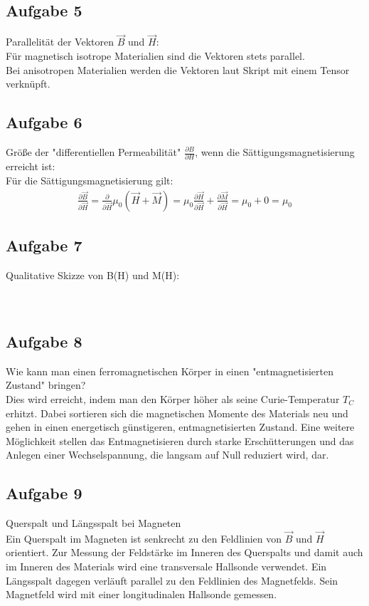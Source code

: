 \documentclass[a4paper,10pt]{scrartcl}
\begin{document}
\subsection{Aufgabe 5}
Parallelität der Vektoren $\vec{B}$ und $\vec{H}$: \\
Für magnetisch isotrope Materialien sind die Vektoren stets parallel. \\
Bei anisotropen Materialien werden die Vektoren laut Skript mit einem Tensor verknüpft.
\subsection{Aufgabe 6}
Größe der "differentiellen Permeabilität" $\frac{\partial B}{\partial H}$, wenn die Sättigungsmagnetisierung erreicht ist: \\
Für die Sättigungsmagnetisierung gilt: \\
\begin{align*}
\frac{\partial \vec{B}}{\partial \vec{H}} = \frac{\partial}{\partial \vec{H}} \mu_0 (\vec{H} + \vec{M}) = \mu_0 \frac{\partial \vec{H}}{\partial \vec{H}}+ \frac{\partial \vec{M}}{\partial \vec{H}} = \mu_0 + 0 = \mu_0 
\end{align*}
\subsection{Aufgabe 7}
Qualitative Skizze von B(H) und M(H): \\ \\ \\
\subsection{Aufgabe 8}
Wie kann man einen ferromagnetischen Körper in einen "entmagnetisierten Zustand" bringen? \\
Dies wird erreicht, indem man den Körper höher als seine Curie-Temperatur $T_C$ erhitzt. Dabei sortieren sich die magnetischen Momente des Materials neu und gehen in einen energetisch günstigeren, entmagnetisierten Zustand. Eine weitere Möglichkeit stellen das Entmagnetisieren durch starke Erschütterungen und das Anlegen einer Wechselspannung, die langsam auf Null reduziert wird, dar.
\subsection{Aufgabe 9}
Querspalt und Längsspalt bei Magneten \\
Ein Querspalt im Magneten ist senkrecht zu den Feldlinien von $\vec{B}$ und $\vec{H}$ orientiert. Zur Messung der Feldstärke im Inneren des Querspalts und damit auch im Inneren des Materials wird eine transversale Hallsonde verwendet.
Ein Längsspalt dagegen verläuft parallel zu den Feldlinien des Magnetfelds. Sein Magnetfeld wird mit einer longitudinalen Hallsonde gemessen.
\end{document}
